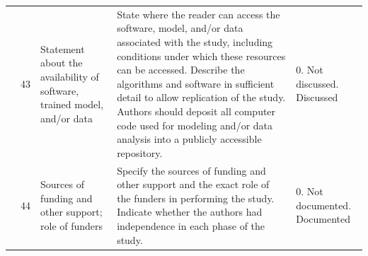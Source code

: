 \begin{landscape}
\begin{longtable}{@{}p{1.7cm}p{0.7cm}p{3.6cm}p{9.6cm}p{3.2cm}@{}}
	\addlinespace
	& 43 & Statement about the availability of software, trained model, and/or data & State where the reader can access the software, model, and/or data associated with the study, including conditions under which these resources can be accessed. Describe the algorithms and software in sufficient detail to allow replication of the study. Authors should deposit all computer code used for modeling and/or data analysis into a publicly accessible repository. & 0. Not discussed\newline 1. Discussed \\
	\addlinespace
	& 44 & Sources of funding and other support; role of funders & Specify the sources of funding and other support and the exact role of the funders in performing the study. Indicate whether the authors had independence in each phase of the study. & 0. Not documented\newline 1. Documented \\
\end{longtable}
\end{landscape}

